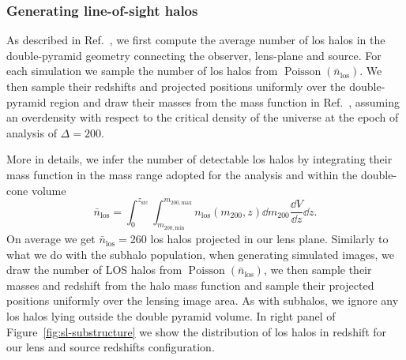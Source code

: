 \subsubsection{Generating line-of-sight halos}

As described in Ref.~\cite{CaganSengul:2020nat}, we first compute the average number of \gls*{los} halos in the double-pyramid geometry connecting the observer, lens-plane and source. For each simulation we sample the number of \gls*{los} halos from $\operatorname{Poisson}(\bar{n}_\mathrm{los})$. We then sample their redshifts and projected positions uniformly over the double-pyramid region and draw their masses from the mass function in Ref.~\cite{Tinker:2008ff}, assuming an overdensity with respect to the critical density of the universe at the epoch of analysis of $\Delta=200$. 

More in details, we infer the number of detectable \gls*{los} halos by integrating their mass function in the mass range adopted for the analysis and within the double-cone volume
\begin{equation}
    \bar{n}_{\mathrm{los}}=\int_0^{z_\mathrm{src}}\int_{m_\mathrm{200,min}}^{m_\mathrm{200, max}} n_\mathrm{los}(m_\mathrm{200}, z)\dd{m_\mathrm{200}} \frac{\dd{V}}{\dd{z}}\dd z.
\end{equation}
On average we get $\bar{n}_{\mathrm{los}}=260$ \gls*{los} halos projected in our lens plane. Similarly to what we do with the subhalo population, when generating simulated images, we draw the number of LOS halos from $\operatorname{Poisson}(\bar{n}_\mathrm{los})$, we then sample their masses and redshift from the halo mass function and sample their projected positions uniformly over the lensing image area. As with subhalos, we ignore any \gls*{los} halos lying outside the double pyramid volume. In right panel of Figure~\ref{fig:sl-substructure} we show the distribution of \gls*{los} halos in redshift for our lens and source redshifts configuration.

